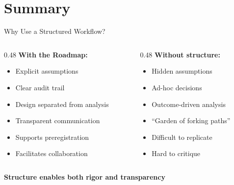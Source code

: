 \documentclass[aspectratio=169]{beamer}
\begin{document}
\section{Summary}

\begin{frame}{Why Use a Structured Workflow?}
  \small
  \begin{columns}[T]
    \begin{column}{0.48\textwidth}
      \textcolor{green!60!black}{\textbf{With the Roadmap:}}
      \begin{itemize}
        \item Explicit assumptions
        \item Clear audit trail
        \item Design separated from analysis
        \item Transparent communication
        \item Supports preregistration
        \item Facilitates collaboration
      \end{itemize}
    \end{column}
    \begin{column}{0.48\textwidth}
      \textcolor{red!70!black}{\textbf{Without structure:}}
      \begin{itemize}
        \item Hidden assumptions
        \item Ad-hoc decisions
        \item Outcome-driven analysis
        \item ``Garden of forking paths''
        \item Difficult to replicate
        \item Hard to critique
      \end{itemize}
    \end{column}
  \end{columns}
  \vspace{1em}
  \centering
  \Large
  \textbf{Structure enables both \textcolor{accent}{rigor} and \textcolor{accent}{transparency}}
\end{frame}
\end{document}
